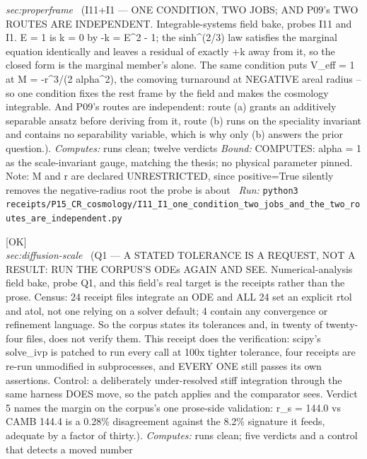 \begin{description}
\textit{sec:properframe} \ (I11+I1 --- ONE CONDITION, TWO JOBS; AND P09's TWO ROUTES ARE INDEPENDENT. Integrable-systems field bake, probes I11 and I1. E = 1 is k = 0 by -k = E\textasciicircum{}2 - 1; the sinh\textasciicircum{}(2/3) law satisfies the marginal equation identically and leaves a residual of exactly +k away from it, so the closed form is the marginal member's alone. The same condition puts V\_eff = 1 at M = -r\textasciicircum{}3/(2 alpha\textasciicircum{}2), the comoving turnaround at NEGATIVE areal radius -- so one condition fixes the rest frame by the field and makes the cosmology integrable. And P09's routes are independent: route (a) grants an additively separable ansatz before deriving from it, route (b) runs on the speciality invariant and contains no separability variable, which is why only (b) answers the prior question.). 
\emph{Computes:} runs clean; twelve verdicts
 \emph{Bound:} COMPUTES: alpha = 1 as the scale-invariant gauge, matching the thesis; no physical parameter pinned. Note: M and r are declared UNRESTRICTED, since positive=True silently removes the negative-radius root the probe is about
\ \emph{Run:} \texttt{python3 receipts/P15\_CR\_cosmology/I11\_I1\_one\_condition\_two\_jobs\_and\_the\_two\_routes\_are\_independent.py}
\item[\label{rcpt:Q1_a_stated_tolerance_is_a_request_and_the_corpus_answers_it}\textbf{}\quad\texttt{Q1\_a\_stated\_tolerance\_is\_a\_request\_and\_the\_corpus\_answers\_it}]\hfill\textsf{[OK]}\\
\textit{sec:diffusion-scale} \ (Q1 --- A STATED TOLERANCE IS A REQUEST, NOT A RESULT: RUN THE CORPUS'S ODEs AGAIN AND SEE. Numerical-analysis field bake, probe Q1, and this field's real target is the receipts rather than the prose. Census: 24 receipt files integrate an ODE and ALL 24 set an explicit rtol and atol, not one relying on a solver default; 4 contain any convergence or refinement language. So the corpus states its tolerances and, in twenty of twenty-four files, does not verify them. This receipt does the verification: scipy's solve\_ivp is patched to run every call at 100x tighter tolerance, four receipts are re-run unmodified in subprocesses, and EVERY ONE still passes its own assertions. Control: a deliberately under-resolved stiff integration through the same harness DOES move, so the patch applies and the comparator sees. Verdict 5 names the margin on the corpus's one prose-side validation: r\_s = 144.0 vs CAMB 144.4 is a 0.28\% disagreement against the 8.2\% signature it feeds, adequate by a factor of thirty.). 
\emph{Computes:} runs clean; five verdicts and a control that detects a moved number

\end{description}
